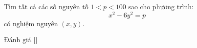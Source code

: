 \ifshowproblem
\begin{problem}\label{problem:THA-2015-TSTST-Q-P1}
    Tìm tất cả các số nguyên tố \( 1 < p < 100 \) sao cho phương trình:
    \[
        x^2 - 6y^2 = p
    \]
    có nghiệm nguyên \( (x, y) \).
\end{problem}
\fi

\ifshowinfo
Đánh giá [\textbf{}]\footnotemark
{}
\fi